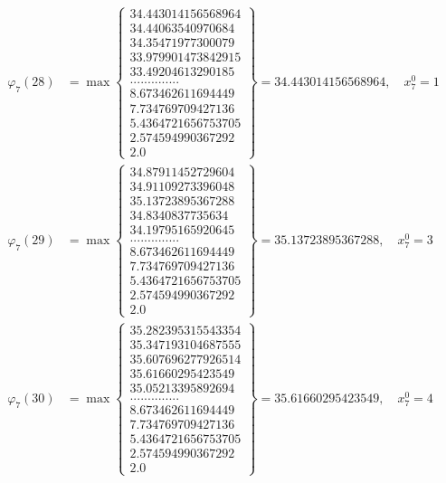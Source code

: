\documentclass{article}
\begin{document}
\begin{align*}
  
  
  
\varphi_{7}(28) &= \max \left\{ \begin{array}{c}
34.443014156568964 \\
 34.44063540970684 \\
 34.35471977300079 \\
 33.979901473842915 \\
 33.49204613290185 \\
 .............. \\
 8.673462611694449 \\
 7.734769709427136 \\
 5.4364721656753705 \\
 2.574594990367292 \\
 2.0
\end{array} \right\} = 34.443014156568964, \quad x_{7}^0 = 1\\
  
  
  
  
\varphi_{7}(29) &= \max \left\{ \begin{array}{c}
34.87911452729604 \\
 34.91109273396048 \\
 35.13723895367288 \\
 34.8340837735634 \\
 34.19795165920645 \\
 .............. \\
 8.673462611694449 \\
 7.734769709427136 \\
 5.4364721656753705 \\
 2.574594990367292 \\
 2.0
\end{array} \right\} = 35.13723895367288, \quad x_{7}^0 = 3\\
  
  
  
  
\varphi_{7}(30) &= \max \left\{ \begin{array}{c}
35.282395315543354 \\
 35.347193104687555 \\
 35.607696277926514 \\
 35.61660295423549 \\
 35.05213395892694 \\
 .............. \\
 8.673462611694449 \\
 7.734769709427136 \\
 5.4364721656753705 \\
 2.574594990367292 \\
 2.0
\end{array} \right\} = 35.61660295423549, \quad x_{7}^0 = 4\\
  

\end{align*}
\end{document}
